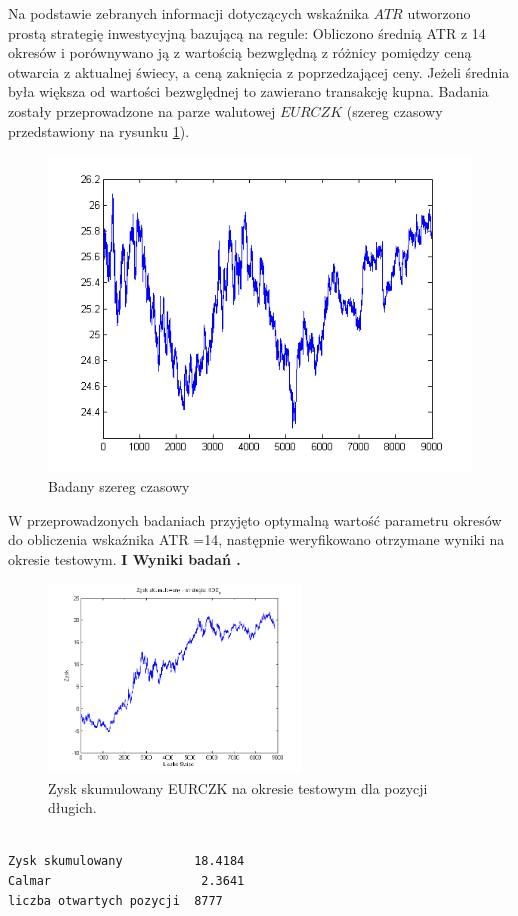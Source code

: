 \documentclass[12pt,a4paper]{article}
\begin{document}
Na podstawie zebranych informacji dotyczących wskaźnika $ATR$ utworzono prostą strategię inwestycyjną bazującą na regule: Obliczono średnią ATR z 14 okresów i porównywano ją z wartością bezwględną z różnicy pomiędzy ceną otwarcia z aktualnej świecy, a ceną zaknięcia z poprzedzającej ceny. Jeżeli średnia była większa od wartości bezwględnej to zawierano transakcję kupna. Badania zostały przeprowadzone na parze walutowej $EURCZK$ (szereg czasowy przedstawiony na rysunku \ref{rysunek2}). \\
\begin{figure}[h!]
\centering
\includegraphics[width = \textwidth]{podzialDanych.png}
\caption{Badany szereg czasowy}
\label{rysunek2}
\end{figure}
\FloatBarrier
W przeprowadzonych badaniach przyjęto optymalną wartość parametru okresów do obliczenia wskaźnika ATR =14, następnie weryfikowano otrzymane wyniki na okresie testowym. 
\newpage
\noindent \textbf{I Wyniki badań .}\\
\begin{figure}[h!]
\centering
\includegraphics[width = 0.6\textwidth]{ROC_EURJPY_LS_SearchBestK_zysk.png}
\caption{Zysk skumulowany EURCZK na okresie testowym dla pozycji długich. }
\end{figure}
\FloatBarrier
\begin{verbatim}

Zysk skumulowany          18.4184
Calmar                     2.3641
liczba otwartych pozycji  8777





\end{verbatim}
\end{document}
